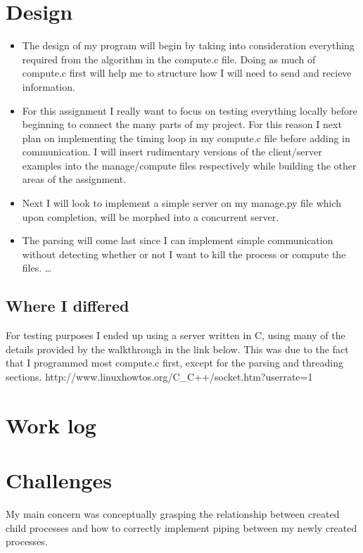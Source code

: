 \documentclass[letterpaper,10pt,titlepage]{article}
\begin{document}
\section{Design}

\begin{itemize} 
\item The design of my program will begin by taking into consideration everything required from the algorithm in the compute.c file. 
Doing as much of compute.c first will help me to structure how I will need to send and recieve information.

\item For this assignment I really want to focus on testing everything locally before beginning to connect the many parts
of my project. For this reason I next plan on implementing the timing loop in my compute.c file before adding in communication.
I will insert rudimentary versions of the client/server examples into the manage/compute files respectively while building the other areas of the
assignment.

\item Next I will look to implement a simple server on my manage.py file which upon completion, will be morphed
into a concurrent server.

\item The parsing will come last since I can implement simple communication 
without detecting whether or not I want to kill the process or compute the files.
\ldots 
\end{itemize}



\subsection{Where I differed}
For testing purposes I ended up using a server written in C, using many of the details provided by the walkthrough in the link below.
This was due to the fact that I programmed most compute.c first, except for the parsing and threading sections.
http://www.linuxhowtos.org/C_C++/socket.htm?userrate=1


\section{Work log}


\section{Challenges}
My main concern was conceptually grasping the relationship between created child processes 
and how to correctly implement piping between my newly created processes.
\end{document}
